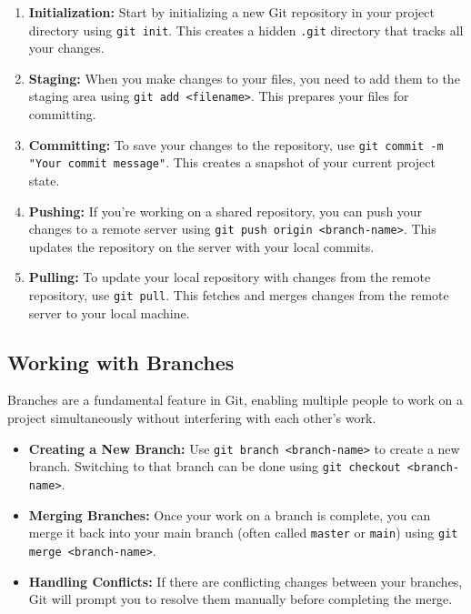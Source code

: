 \begin{enumerate}
    \item \textbf{Initialization:} Start by initializing a new Git repository in your project directory using \texttt{git init}. This creates a hidden \texttt{.git} directory that tracks all your changes.
    
    \item \textbf{Staging:} When you make changes to your files, you need to add them to the staging area using \texttt{git add <filename>}. This prepares your files for committing.
    
    \item \textbf{Committing:} To save your changes to the repository, use \texttt{git commit -m "Your commit message"}. This creates a snapshot of your current project state.
    
    \item \textbf{Pushing:} If you're working on a shared repository, you can push your changes to a remote server using \texttt{git push origin <branch-name>}. This updates the repository on the server with your local commits.
    
    \item \textbf{Pulling:} To update your local repository with changes from the remote repository, use \texttt{git pull}. This fetches and merges changes from the remote server to your local machine.
\end{enumerate}

\subsection{Working with Branches}
Branches are a fundamental feature in Git, enabling multiple people to work on a project simultaneously without interfering with each other’s work.

\begin{itemize}
    \item \textbf{Creating a New Branch:} Use \texttt{git branch <branch-name>} to create a new branch. Switching to that branch can be done using \texttt{git checkout <branch-name>}.
    
    \item \textbf{Merging Branches:} Once your work on a branch is complete, you can merge it back into your main branch (often called \texttt{master} or \texttt{main}) using \texttt{git merge <branch-name>}.
    
    \item \textbf{Handling Conflicts:} If there are conflicting changes between your branches, Git will prompt you to resolve them manually before completing the merge.
\end{itemize}

